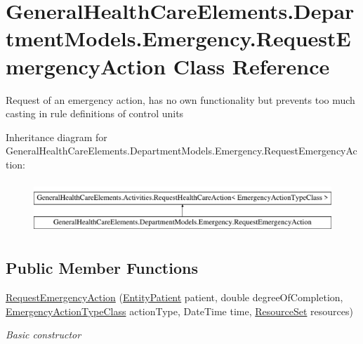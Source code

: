 \hypertarget{class_general_health_care_elements_1_1_department_models_1_1_emergency_1_1_request_emergency_action}{}\section{General\+Health\+Care\+Elements.\+Department\+Models.\+Emergency.\+Request\+Emergency\+Action Class Reference}
\label{class_general_health_care_elements_1_1_department_models_1_1_emergency_1_1_request_emergency_action}


Request of an emergency action, has no own functionality but prevents too much casting in rule definitions of control units  


Inheritance diagram for General\+Health\+Care\+Elements.\+Department\+Models.\+Emergency.\+Request\+Emergency\+Action\+:\begin{figure}[H]
\begin{center}
\leavevmode
\includegraphics[height=1.982301cm]{class_general_health_care_elements_1_1_department_models_1_1_emergency_1_1_request_emergency_action}
\end{center}
\end{figure}
\subsection*{Public Member Functions}
\begin{DoxyCompactItemize}
\item 
\hyperlink{class_general_health_care_elements_1_1_department_models_1_1_emergency_1_1_request_emergency_action_a6da4fe1ac4719835dd27f4ad84d7abd1}{Request\+Emergency\+Action} (\hyperlink{class_general_health_care_elements_1_1_entities_1_1_entity_patient}{Entity\+Patient} patient, double degree\+Of\+Completion, \hyperlink{class_general_health_care_elements_1_1_general_classes_1_1_action_types_and_paths_1_1_emergency_action_type_class}{Emergency\+Action\+Type\+Class} action\+Type, Date\+Time time, \hyperlink{class_general_health_care_elements_1_1_resource_handling_1_1_resource_set}{Resource\+Set} resources)
\begin{DoxyCompactList}\small\item\em Basic constructor \end{DoxyCompactList}\end{DoxyCompactItemize}
